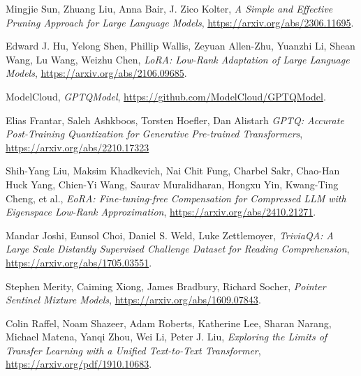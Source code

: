 \begin{thebibliography}{9}
	Mingjie Sun, Zhuang Liu, Anna Bair, J. Zico Kolter,
	\textit{A Simple and Effective Pruning Approach for Large Language Models},
	\url{https://arxiv.org/abs/2306.11695}.

	Edward J. Hu, Yelong Shen, Phillip Wallis, Zeyuan Allen-Zhu, Yuanzhi Li, Shean Wang, Lu Wang, Weizhu Chen,
	\textit{LoRA: Low-Rank Adaptation of Large Language Models},
	\url{https://arxiv.org/abs/2106.09685}.

	ModelCloud,
	\textit{GPTQModel},
	\url{https://github.com/ModelCloud/GPTQModel}.

	Elias Frantar, Saleh Ashkboos, Torsten Hoefler, Dan Alistarh
	\textit{GPTQ: Accurate Post-Training Quantization for Generative Pre-trained Transformers},
	\url{https://arxiv.org/abs/2210.17323}

	Shih-Yang Liu, Maksim Khadkevich, Nai Chit Fung, Charbel Sakr, Chao-Han Huck Yang, Chien-Yi Wang, Saurav Muralidharan, Hongxu Yin, Kwang-Ting Cheng, et al.,
	\textit{EoRA: Fine-tuning-free Compensation for Compressed LLM with Eigenspace Low-Rank Approximation},
	\url{https://arxiv.org/abs/2410.21271}.

	Mandar Joshi, Eunsol Choi, Daniel S. Weld, Luke Zettlemoyer,
	\textit{TriviaQA: A Large Scale Distantly Supervised Challenge Dataset for Reading Comprehension},
	\url{https://arxiv.org/abs/1705.03551}.

	Stephen Merity, Caiming Xiong, James Bradbury, Richard Socher,
	\textit{Pointer Sentinel Mixture Models},
	\url{https://arxiv.org/abs/1609.07843}.

	Colin Raffel, Noam Shazeer, Adam Roberts, Katherine Lee, Sharan Narang, Michael Matena, Yanqi Zhou, Wei Li, Peter J. Liu,	
	\textit{Exploring the Limits of Transfer Learning with a Unified Text-to-Text Transformer},
	\url{https://arxiv.org/pdf/1910.10683}.

\end{thebibliography}